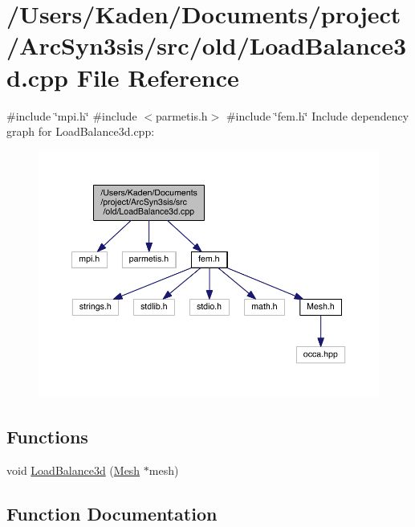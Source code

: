 \hypertarget{a00587}{}\section{/\+Users/\+Kaden/\+Documents/project/\+Arc\+Syn3sis/src/old/\+Load\+Balance3d.cpp File Reference}
\label{a00587}
{\ttfamily \#include \char`\"{}mpi.\+h\char`\"{}}\newline
{\ttfamily \#include $<$parmetis.\+h$>$}\newline
{\ttfamily \#include \char`\"{}fem.\+h\char`\"{}}\newline
Include dependency graph for Load\+Balance3d.\+cpp\+:\nopagebreak
\begin{figure}[H]
\begin{center}
\leavevmode
\includegraphics[width=350pt]{a00588}
\end{center}
\end{figure}
\subsection*{Functions}
\begin{DoxyCompactItemize}
\item 
void \hyperlink{a00587_a004c52e87250e61b258755469b25bbe9}{Load\+Balance3d} (\hyperlink{a00557_aeffbe0891ab73a4d8964c9cb7978426e}{Mesh} $\ast$mesh)
\end{DoxyCompactItemize}


\subsection{Function Documentation}
\mbox{\label{a00587_a004c52e87250e61b258755469b25bbe9}} 
